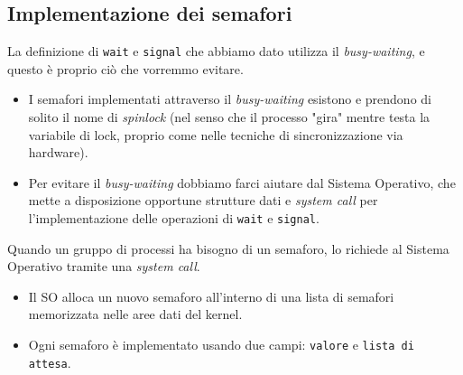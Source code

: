\subsection{Implementazione dei semafori}
La definizione di \texttt{wait} e \texttt{signal} che abbiamo dato utilizza il \textit{busy-waiting}, e questo è proprio ciò che vorremmo evitare.

\begin{itemize}
    \item I semafori implementati attraverso il \textit{busy-waiting} esistono e prendono di solito il nome di \textit{spinlock} (nel senso che il processo "gira" mentre testa la variabile di lock, proprio come nelle tecniche di sincronizzazione via hardware).
    \item Per evitare il \textit{busy-waiting} dobbiamo farci aiutare dal Sistema Operativo, che mette a disposizione opportune strutture dati e \textit{system call} per l'implementazione delle operazioni di \texttt{wait} e \texttt{signal}.
\end{itemize}
Quando un gruppo di processi ha bisogno di un semaforo, lo richiede al Sistema Operativo tramite una \textit{system call}. 
\begin{itemize}
    \item Il SO alloca un nuovo semaforo all'interno di una lista di semafori memorizzata nelle aree dati del kernel.
    \item Ogni semaforo è implementato usando due campi: \texttt{valore} e \texttt{lista di attesa}.
\end{itemize}

